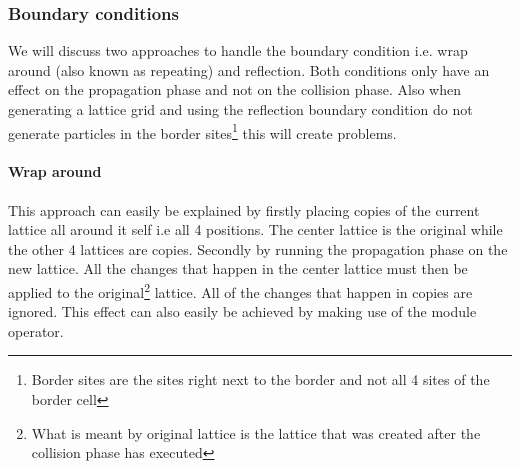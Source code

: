 \documentclass[a4paper,10pt]{article}
\begin{document}
\subsubsection{Boundary conditions}
We will discuss two approaches to handle the boundary condition i.e. wrap around (also known as repeating) and reflection. Both conditions only have an effect on the propagation phase and not on the collision phase. Also when generating a lattice grid and using the reflection boundary condition do not generate particles in the border sites\footnote{Border sites are the sites right next to the border and not all 4 sites of the border cell} this will create problems.
\paragraph{Wrap around}
This approach can easily be explained by firstly placing copies of the current lattice all around it self i.e all 4 positions. The center lattice is the original while the other 4 lattices are copies.
Secondly by running the propagation phase on the new lattice. All the changes that happen in the center lattice must then be applied to the original\footnote{What is meant by original lattice is the lattice that was created after the collision phase has executed} lattice. All of the changes that happen in copies are ignored. This effect can also easily be achieved by making use of the module operator.
\end{document}
